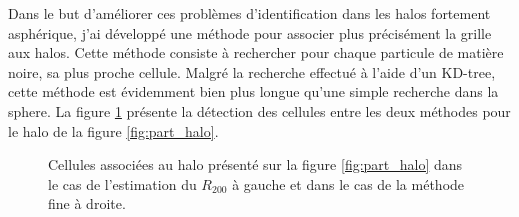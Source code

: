 Dans le but d'améliorer ces problèmes d'identification dans les halos fortement asphérique, j'ai développé une méthode pour associer plus précisément la grille aux halos.
Cette méthode consiste à rechercher pour chaque particule de matière noire, sa plus proche cellule.
Malgré la recherche effectué à l'aide d'un KD-tree, cette méthode est évidemment bien plus longue qu'une simple recherche dans la sphere.
La figure \ref{fig:R200_fine} présente la détection des cellules entre les deux méthodes pour le halo de la figure \ref{fig:part_halo}.




\begin{figure}
    \caption[Méthodes d'association matière noire - grille]{Cellules associées au halo présenté sur la figure \ref{fig:part_halo} dans le cas de l'estimation du $R_{200}$ à gauche et dans le cas de la méthode fine à droite.       
 	\label{fig:R200_fine}}
\end{figure}


